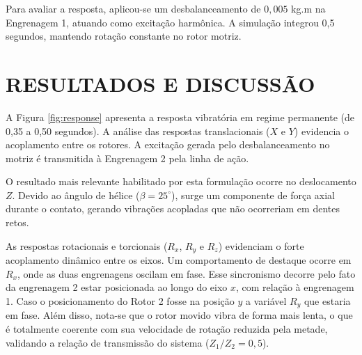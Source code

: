 \documentclass[10pt,fleqn,a4paper,twoside]{article}
\begin{document}
	Para avaliar a resposta, aplicou-se um desbalanceamento de $0,005$ kg.m na Engrenagem 1, atuando como excitação harmônica. A simulação integrou 0,5 segundos, mantendo rotação constante no rotor motriz.
	
	\section{RESULTADOS E DISCUSSÃO}
	
	A Figura \ref{fig:response} apresenta a resposta vibratória em regime permanente (de 0,35 a 0,50 segundos). A análise das respostas translacionais ($X$ e $Y$) evidencia o acoplamento entre os rotores. A excitação gerada pelo desbalanceamento no motriz é transmitida à Engrenagem 2 pela linha de ação.
	
	O resultado mais relevante habilitado por esta formulação ocorre no deslocamento $Z$. Devido ao ângulo de hélice ($\beta = 25^\circ$), surge um componente de força axial durante o contato, gerando vibrações acopladas que não ocorreriam em dentes retos.
	
	As respostas rotacionais e torcionais ($R_x$, $R_y$ e $R_z$) evidenciam o forte acoplamento dinâmico entre os eixos. Um comportamento de destaque ocorre em $R_x$, onde as duas engrenagens oscilam em fase. 
	Esse sincronismo decorre pelo fato da engrenagem 2 estar posicionada ao longo do eixo $x$, com relação à engrenagem 1. Caso o posicionamento do Rotor 2 fosse na posição $y$ a variável $R_y$ que estaria em fase.
	 Além disso, nota-se que o rotor movido vibra de forma mais lenta, o que é totalmente coerente com sua velocidade de rotação reduzida pela metade, validando a relação de transmissão do sistema ($Z_1/Z_2 = 0,5$).
	
\end{document}
